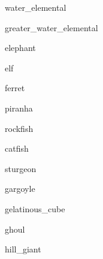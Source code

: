 \documentclass[letterpaper,serif]{module}
\begin{document}
\begin{newmonster}{water_elemental}\end{newmonster}

\begin{newmonster}{greater_water_elemental}\end{newmonster}

\begin{newmonster}{elephant}\end{newmonster}

\begin{newmonster}{elf}\end{newmonster}

\begin{newmonster}{ferret}\end{newmonster}


\begin{newmonster}{piranha}\end{newmonster}

\begin{newmonster}{rockfish}\end{newmonster}

\begin{newmonster}{catfish}\end{newmonster}

\begin{newmonster}{sturgeon}\end{newmonster}

\begin{newmonster}{gargoyle}\end{newmonster}

\begin{newmonster}{gelatinous_cube}\end{newmonster}

\begin{newmonster}{ghoul}\end{newmonster}


\begin{newmonster}{hill_giant}\end{newmonster}
\end{document}

